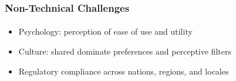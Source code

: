 \begin{frame}
  \frametitle{Non-Technical Challenges}
  \framesubtitle{}
  \begin{itemize}
    \item<1->Psychology: perception of ease of use and utility


    \item<2->Culture: shared dominate preferences and perceptive filters

    \item<3->Regulatory compliance across nations, regions, and locales


  \end{itemize}
\end{frame}

